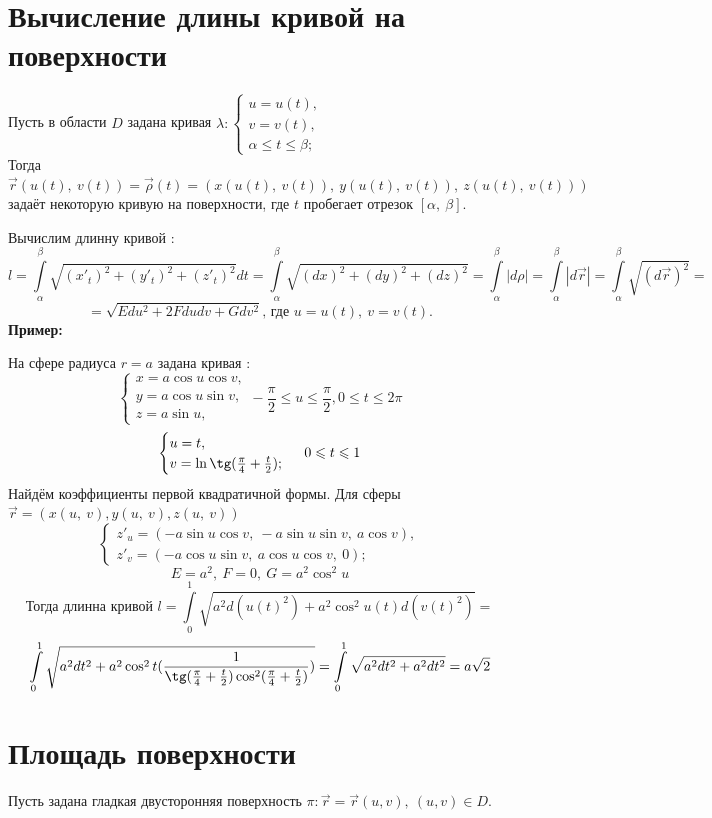 \documentclass[../../main.tex]{subfiles}
\begin{document}
\section{Вычисление длины кривой на поверхности}


   Пусть в области $D$ задана кривая 
$\lambda : \begin{cases}
             u = u(t),\\
             v = v(t),\\
             \alpha \leq t \leq \beta;
            \end{cases}$\\
Тогда $\vec{r}(u(t), \ v(t)) = \vec{\rho}(t) = (x(u(t), \ v(t)), \ y(u(t), \ 
v(t)), \ z(u(t), \ v(t)))$ задаёт некоторую кривую на поверхности, где $t$ 
пробегает отрезок $\left[\alpha, \ \beta\right]$.

Вычислим длинну кривой : 
\[
l = \int\limits_\alpha^\beta\sqrt{(x'_t)^2 + (y'_t)^2 + (z'_t)^2}dt = 
\int\limits_\alpha^\beta\sqrt{(dx)^2 + (dy)^2 + (dz)^2} = 
\int\limits_\alpha^\beta  |d\rho| =  \int\limits_\alpha^\beta|d\vec{r}| = 
\int\limits_\alpha^\beta\sqrt{(d\vec{r})^2} = \] 
\[ 
= \sqrt{Edu^2 + 2Fdudv + Gdv^2} \text{, где } u = u(t), \ v = v(t). 
\]
\textbf{Пример:}

На сфере радиуса $r = a$ задана кривая :
\[\begin{cases}
 x = a\cos u\cos v,\\
 y = a\cos u\sin v,\\
 z = a\sin u,
 \end{cases}
 -\frac{\pi}{2} \leq u \leq \frac{\pi}{2},
 0\leq t \leq 2\pi\]
\[\begin{cases}
u = t,\\
v = \ln\tg(\frac{\pi}{4} + \frac{t}{2});
\end{cases} \ 0 \leq t \leq 1\]
Найдём коэффициенты первой квадратичной формы. Для сферы $\vec{r} = (x(u, \ 
v), y(u, \ v), z(u, \ v))$
\[
\begin{cases}
z'_u = (-a\sin u\cos v, \ -a\sin u\sin v, \ a\cos v),\\
z'_v = (-a\cos u\sin v, \ a\cos u\cos v, \ 0);
\end{cases}
\]
\[
E = a^2, \ F = 0, \ G = a^2\cos^2u
\]
\[
\text{Тогда длинна кривой } l = \int\limits_0^1\sqrt{a^2d(u(t)^2) + 
a^2\cos^2u(t)d(v(t)^2)} =
\]
\[\int\limits_0^1\sqrt{a^2dt^2 + a^2\cos^2t(\frac{1}{\tg(\frac{\pi}{4} + 
\frac{t}{2})\cos^2(\frac{\pi}{4} + \frac{t}{2})})} = 
\int\limits_0^1\sqrt{a^2dt^2 + a^2dt^2} = a\sqrt{2}
\]
\section{Площадь поверхности}
Пусть задана гладкая двусторонняя поверхность $\pi : \vec{r} = \vec{r}(u, v), 
\ (u, v) \in D$.
\end{document}
